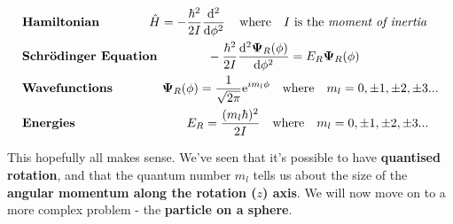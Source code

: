 \documentclass{memoir}[11pt,oneside,a4paper,openany]
\newenvironment{myblock}[1]{%
    \tcolorbox[beamer,%
    noparskip,breakable,
    colback=LightBlue,colframe=DarkBlue,%
    colbacklower=DarkBlue!75!LightBlue,%
    title=#1]}%
    {\endtcolorbox}
\newcommand{\wf}{\ensuremath{\bm{\Psi}}\xspace}
\newcommand{\dd}{\ensuremath{\mathrm{d}}}
\begin{document}
\begin{myblock}{\begin{center}Particle on a Ring\end{center}}
	\begin{center}
		\begin{align*} & \text{\textbf{Hamiltonian}} \qquad\qquad \hat{H} = -\frac{\hbar^2}{2I}\frac{\dd^2}{\dd \phi^2} \,\quad  \text{where} \quad I \,\,\text{is the \emph{moment of inertia}} \\
			& \text{\textbf{Schr{\"o}dinger Equation}} \qquad\qquad -\frac{\hbar^2}{2I}\frac{\dd^2\wf_R(\phi)}{\dd \phi^2} = E_R \wf_R(\phi) \\
			& \text{\textbf{Wavefunctions}} \qquad\qquad \wf_R(\phi) = \frac{1}{\sqrt{2\pi}}\mathrm{e}^{im_l\phi} \quad \text{where} \quad m_l=0,\pm1,\pm2,\pm3...\\
			& \text{\textbf{Energies}} \qquad\qquad\qquad\qquad\quad E_R = \frac{(m_l\hbar)^2}{2I} \quad \text{where} \quad m_l=0,\pm1,\pm2,\pm3...
	\end{align*}
	\end{center}
\end{myblock}

This hopefully all makes sense. We've seen that it's possible to have \textbf{quantised rotation}, and that the quantum number $m_l$ tells us about the size of the \textbf{angular momentum along the rotation ($z$) axis}. We will now move on to a more complex problem - the \textbf{particle on a sphere}.
\newpage
\end{document}

